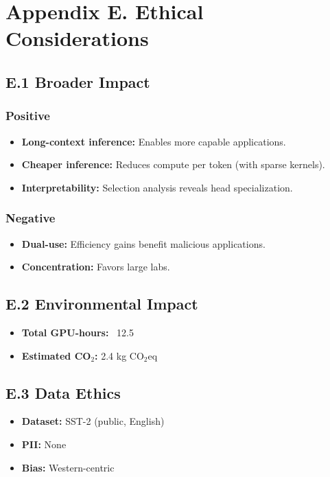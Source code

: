 
\section{Appendix E. Ethical Considerations}

\subsection{E.1 Broader Impact}

\subsubsection{Positive}
\begin{itemize}
\item \textbf{Long-context inference:} Enables more capable applications.
\item \textbf{Cheaper inference:} Reduces compute per token (with sparse kernels).
\item \textbf{Interpretability:} Selection analysis reveals head specialization.

\end{itemize}
\subsubsection{Negative}
\begin{itemize}
\item \textbf{Dual-use:} Efficiency gains benefit malicious applications.
\item \textbf{Concentration:} Favors large labs.

\end{itemize}
\subsection{E.2 Environmental Impact}

\begin{itemize}
\item \textbf{Total GPU-hours:} ~12.5
\item \textbf{Estimated CO$_2$:} 2.4 kg CO$_2$eq

\end{itemize}
\subsection{E.3 Data Ethics}

\begin{itemize}
\item \textbf{Dataset:} SST-2 (public, English)
\item \textbf{PII:} None
\item \textbf{Bias:} Western-centric

\end{itemize}
